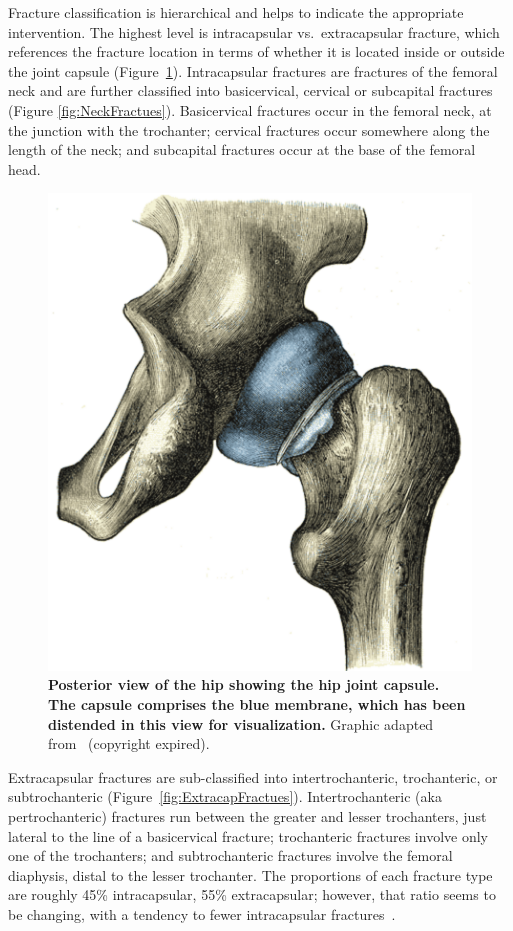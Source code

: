 Fracture classification is hierarchical and helps to indicate the appropriate intervention.
The highest level is intracapsular vs.\ extracapsular fracture, which references the fracture location in terms of whether it is located inside or outside the joint capsule (Figure~\ref{fig:HipCapsule}).
Intracapsular fractures are fractures of the femoral neck and are further classified into basicervical, cervical or subcapital fractures (Figure \ref{fig:NeckFractues}).
Basicervical fractures occur in the femoral neck, at the junction with the trochanter; cervical fractures occur somewhere along the length of the neck; and subcapital fractures occur at the base of the femoral head.

\begin{figure}
\centering
\includegraphics[width=0.7\linewidth]{./intro/Figures/HipCapsule}
\caption[The hip joint capsule]{\textbf{Posterior view of the hip showing the hip joint capsule. The capsule comprises the blue membrane, which has been distended in this view for visualization.} Graphic adapted from~\citet{gray_anatomy_1918} (copyright expired).}
\label{fig:HipCapsule}
\end{figure}

Extracapsular fractures are sub-classified into intertrochanteric, trochanteric, or subtrochanteric (Figure~\ref{fig:ExtracapFractues}).
Intertrochanteric (\acs{aka} pertrochanteric) fractures run between the greater and lesser trochanters, just lateral to the line of a basicervical fracture; trochanteric fractures involve only one of the trochanters; and subtrochanteric fractures involve the femoral diaphysis, distal to the lesser trochanter. 
The proportions of each fracture type are roughly 45\% intracapsular, 55\% extracapsular; however, that ratio seems to be changing, with a tendency to fewer intracapsular fractures~\citep{haleem_mortality_2008}.

